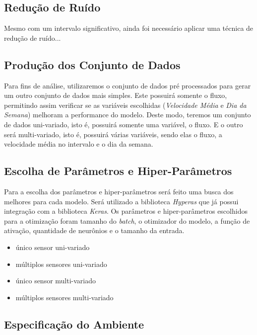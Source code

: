 \subsection{Redução de Ruído}

Mesmo com um intervalo significativo, ainda foi necessário aplicar uma técnica de redução de ruído...

\subsection{Produção dos Conjunto de Dados}

Para fins de análise, utilizaremos o conjunto de dados pré processados para gerar um outro conjunto de dados mais simples. Este possuirá somente o fluxo, permitindo assim verificar se as variáveis escolhidas (\textit{Velocidade Média} e \textit{Dia da Semana}) melhoram a performance do modelo. Deste modo, teremos um conjunto de dados uni-variado, isto é, possuirá somente uma variável, o fluxo. E o outro será multi-variado, isto é, possuirá várias variáveis, sendo elas o fluxo, a velocidade média no intervalo e o dia da semana.

\subsection{Escolha de Parâmetros e Hiper-Parâmetros}

Para a escolha dos parâmetros e hiper-parâmetros será feito uma busca dos melhores para cada modelo. Será utilizado a biblioteca \textit{Hyperas} que já possui integração com a biblioteca \textit{Keras}. Os parâmetros e hiper-parâmetros escolhidos para a otimização foram tamanho do \textit{batch}, o otimizador do modelo, a função de ativação, quantidade de neurônios e o tamanho da entrada. 

\begin{itemize}
    \item único sensor uni-variado
    \item múltiplos sensores uni-variado
    \item único sensor multi-variado
    \item múltiplos sensores multi-variado
\end{itemize}

\subsection{Especificação do Ambiente}

